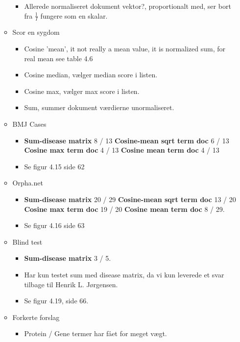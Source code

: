 \documentclass[a4paper, 10pt, english, final]{report}
\begin{document}
\begin{itemize}
\begin{itemize}
\begin{itemize}
          \item Allerede normaliseret dokument vektor?, proportionalt
            med, ser bort fra $\frac{1}{I}$ fungere som en skalar.
        \end{itemize}
      \item Scor en sygdom
        \begin{itemize}
          \item Cosine 'mean', it not really a mean value, it is normalized sum, for real mean see table 4.6
          \item Cosine median, v\ae lger median score i listen.
          \item Cosine max, v\ae lger max score i listen.
          \item Sum, summer dokument v\ae rdierne unormaliseret.
        \end{itemize}
      \item BMJ Cases
        \begin{itemize}
          \item \textbf{Sum-disease matrix} 8 / 13 \textbf{Cosine-mean
            sqrt term doc} 6 / 13 \textbf{Cosine max term doc} 4 / 13
            \textbf{Cosine mean term doc} 4 / 13
          \item Se figur 4.15 side 62
        \end{itemize}
      \item Orpha.net
        \begin{itemize}
          \item \textbf{Sum-disease matrix} 20 / 29
            \textbf{Cosine-mean sqrt term doc} 13 / 20 \textbf{Cosine
              max term doc} 19 / 20 \textbf{Cosine mean term doc} 8 /
            29.
          \item Se figur 4.16 side 63
        \end{itemize}
      \item Blind test
        \begin{itemize}
          \item \textbf{Sum-disease matrix} 3 / 5.
          \item Har kun testet sum med disease matrix, da vi kun
            leverede et svar tilbage til Henrik L. J\o rgensen.
          \item Se figur 4.19, side 66.
        \end{itemize}
      \item Forkerte forslag
        \begin{itemize}
          \item Protein / Gene termer har f\aa et for meget v\ae gt.

\end{itemize}
\end{itemize}
\end{itemize}
\end{document}
